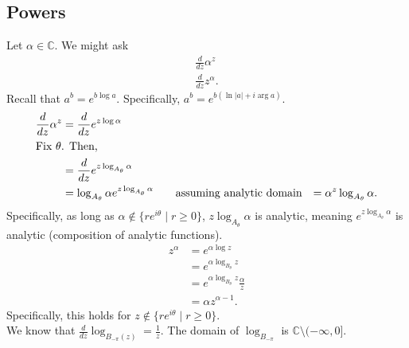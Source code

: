 \documentclass[10pt]{extarticle}
\newcommand{\C}{\mathbb{C}}
\begin{document}
  \subsection{Powers}%
  Let $\alpha \in \C$. We might ask
  \begin{align*}
    \frac{d}{dz}\alpha^{z}\\
    \frac{d}{dz}z^{\alpha}.
  \end{align*}
  Recall that $a^b = e^{b \log a}$. Specifically, $a^b = e^{b (\ln|a| + i\arg a)}$.
  \begin{align*}
    \frac{d}{dz}\alpha^{z} &= \frac{d}{dz}e^{z\log \alpha}\\
    \intertext{Fix $\theta$. Then,}
                           &= \frac{d}{dz}e^{z\log_{A_{\theta}}\alpha}\\
                           &= \log_{A_{\theta}}\alpha e^{z\log_{A_{\theta}}\alpha} \tag*{assuming analytic domain}
                           &= \alpha^{z}\log_{A_{\theta}}\alpha.
  \end{align*}
  Specifically, as long as $\alpha \notin \{re^{i\theta}\mid r \geq 0\}$, $z\log_{A_{\theta}}\alpha$ is analytic, meaning $e^{z\log_{A_{\theta}}\alpha}$ is analytic (composition of analytic functions).
  \begin{align*}
    z^{\alpha} &= e^{\alpha \log z}\\
               &= e^{\alpha \log_{B_{\theta}} z}\\
               &= e^{\alpha \log_{B_{\theta}}z} \frac{\alpha}{z}\\
               &= \alpha z^{\alpha - 1}.
  \end{align*}
  Specifically, this holds for $z\notin \{re^{i\theta}\mid r\geq 0\}$.\\

  We know that $\frac{d}{dz}\log_{B_{-\pi}(z)} = \frac{1}{z}$. The domain of $\log_{B_{-\pi}}$ is $\C\setminus (-\infty,0]$.
\end{document}
